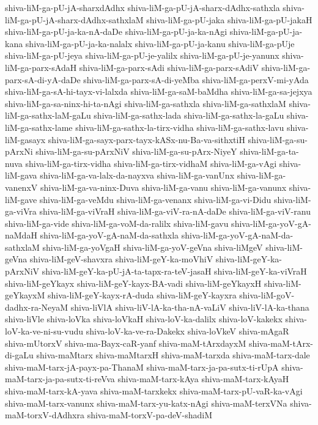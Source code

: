 {shiva-liM-ga-pU-jA-sharxdAdhx
shiva-liM-ga-pU-jA-sharx-dAdhx-sathxla
shiva-liM-ga-pU-jA-sharx-dAdhx-sathxlaM
shiva-liM-ga-pU-jaka
shiva-liM-ga-pU-jakaH
shiva-liM-ga-pU-ja-ka-nA-daDe
shiva-liM-ga-pU-ja-ka-nAgi
shiva-liM-ga-pU-ja-kana
shiva-liM-ga-pU-ja-ka-nalalx
shiva-liM-ga-pU-ja-kanu
shiva-liM-ga-pUje
shiva-liM-ga-pU-jeya
shiva-liM-ga-pU-je-yalilx
shiva-liM-ga-pU-je-yanunx
shiva-liM-ga-parx-sAdaH
shiva-liM-ga-parx-sAdi
shiva-liM-ga-parx-sAdiV
shiva-liM-ga-parx-sA-di-yA-daDe
shiva-liM-ga-parx-sA-di-yeMba
shiva-liM-ga-perxV-mi-yAda
shiva-liM-ga-sA-hi-tayx-vi-lalxda
shiva-liM-ga-saM-baMdha
shiva-liM-ga-sa-jejxya
shiva-liM-ga-sa-ninx-hi-ta-nAgi
shiva-liM-ga-sathxla
shiva-liM-ga-sathxlaM
shiva-liM-ga-sathx-laM-gaLu
shiva-liM-ga-sathx-lada
shiva-liM-ga-sathx-la-gaLu
shiva-liM-ga-sathx-lame
shiva-liM-ga-sathx-la-tirx-vidha
shiva-liM-ga-sathx-lavu
shiva-liM-gasayx
shiva-liM-ga-sayx-parx-tayx-kASx-nu-Ba-va-sithxtiH
shiva-liM-ga-su-pArxNi
shiva-liM-ga-su-pArxNiV
shiva-liM-ga-su-pArx-NiyeY
shiva-liM-ga-ta-nuva
shiva-liM-ga-tirx-vidha
shiva-liM-ga-tirx-vidhaM
shiva-liM-ga-vAgi
shiva-liM-gava
shiva-liM-ga-va-lalx-da-nayxva
shiva-liM-ga-vanUnx
shiva-liM-ga-vanenxV
shiva-liM-ga-va-ninx-Duva
shiva-liM-ga-vanu
shiva-liM-ga-vanunx
shiva-liM-gave
shiva-liM-ga-veMdu
shiva-liM-ga-venanx
shiva-liM-ga-vi-Didu
shiva-liM-ga-viVra
shiva-liM-ga-viVraH
shiva-liM-ga-viV-ra-nA-daDe
shiva-liM-ga-viV-ranu
shiva-liM-ga-vide
shiva-liM-ga-voM-da-ralilx
shiva-liM-gavu
shiva-liM-ga-yoV-gA-naMdaH
shiva-liM-ga-yoV-gA-naM-da-sathxla
shiva-liM-ga-yoV-gA-naM-da-sathxlaM
shiva-liM-ga-yoVgaH
shiva-liM-ga-yoV-geVna
shiva-liMgeV
shiva-liM-geVna
shiva-liM-geV-shavxra
shiva-liM-geY-ka-moVhiV
shiva-liM-geY-ka-pArxNiV
shiva-liM-geY-ka-pU-jA-ta-tapx-ra-teV-jasaH
shiva-liM-geY-ka-viVraH
shiva-liM-geYkayx
shiva-liM-geY-kayx-BA-vadi
shiva-liM-geYkayxH
shiva-liM-geYkayxM
shiva-liM-geY-kayx-rA-duda
shiva-liM-geY-kayxra
shiva-liM-goV-dadhx-ra-NeyaM
shiva-liVlA
shiva-liV-lA-ka-tha-nA-vaLiV
shiva-liV-lA-ka-thana
shiva-liVle
shiva-loVka
shiva-loVkaH
shiva-loV-ka-dalilx
shiva-loV-kakekx
shiva-loV-ka-ve-ni-su-vudu
shiva-loV-ka-ve-ra-Dakekx
shiva-loVkeV
shiva-mAgaR
shiva-mUtorxV
shiva-ma-Bayx-caR-yanf
shiva-maM-tArxdayxM
shiva-maM-tArx-di-gaLu
shiva-maMtarx
shiva-maMtarxH
shiva-maM-tarxda
shiva-maM-tarx-dale
shiva-maM-tarx-jA-payx-pa-ThanaM
shiva-maM-tarx-ja-pa-sutx-ti-rUpA
shiva-maM-tarx-ja-pa-sutx-ti-reVva
shiva-maM-tarx-kAya
shiva-maM-tarx-kAyaH
shiva-maM-tarx-kA-yava
shiva-maM-tarxkekx
shiva-maM-tarx-pU-vaR-ka-vAgi
shiva-maM-tarx-vanunx
shiva-maM-tarx-yu-katx-nAgi
shiva-maM-terxVNa
shiva-maM-torxV-dAdhxra
shiva-maM-torxV-pa-deV-shadiM
}

